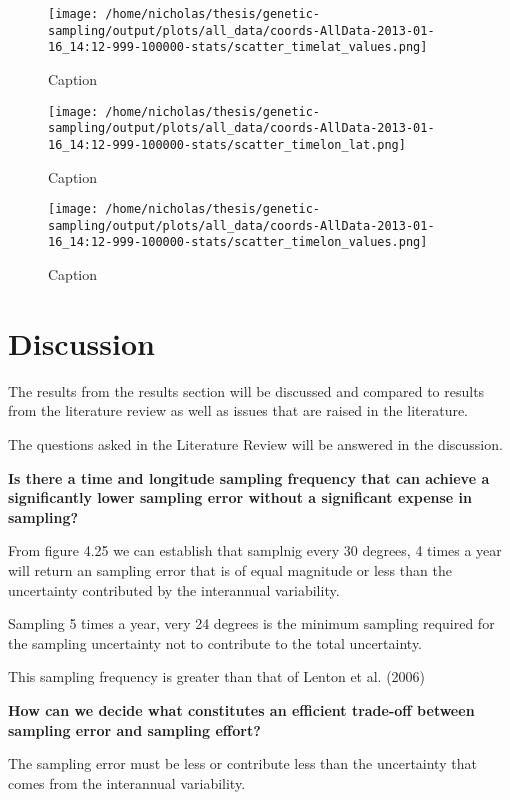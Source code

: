 \documentclass[11pt, a4paper]{article}
\numberwithin{figure}{section}
\numberwithin{table}{section}
\begin{document}
\begin{figure}[H]
\caption{Caption}
\centering
\texttt{[image: /home/nicholas/thesis/genetic-sampling/output/plots/all\_data/coords-AllData-2013-01-16\_14:12-999-100000-stats/scatter\_timelat\_values.png]}
\end{figure}

\begin{figure}[H]
\caption{Caption}
\centering
\texttt{[image: /home/nicholas/thesis/genetic-sampling/output/plots/all\_data/coords-AllData-2013-01-16\_14:12-999-100000-stats/scatter\_timelon\_lat.png]}
\end{figure}

\begin{figure}[H]
\caption{Caption}
\centering
\texttt{[image: /home/nicholas/thesis/genetic-sampling/output/plots/all\_data/coords-AllData-2013-01-16\_14:12-999-100000-stats/scatter\_timelon\_values.png]}
\end{figure}

\newpage
\section{Discussion}
The results from the 
results section will be discussed and compared to results from the 
literature review as well as issues that are raised in the literature.

The questions asked in the Literature Review will
be answered in the discussion.

\textbf{Is there a time and longitude sampling frequency that can achieve a significantly
lower sampling error without a significant expense in sampling?}

From figure 4.25 we can
establish that samplnig every 30 degrees, 
4 times a year will return an sampling error
that is of equal magnitude or less than the
uncertainty contributed by the interannual variability.

Sampling 5 times a year, very 24 degrees is the minimum sampling
required for the sampling uncertainty not to contribute to the total 
uncertainty.

This sampling frequency is greater than that of Lenton et al. 
(2006)

\textbf{How can we decide what constitutes an efficient trade-off between sampling error
and sampling effort?}

The sampling error must be less or contribute less than the uncertainty that comes 
from the interannual variability.
\end{document}
